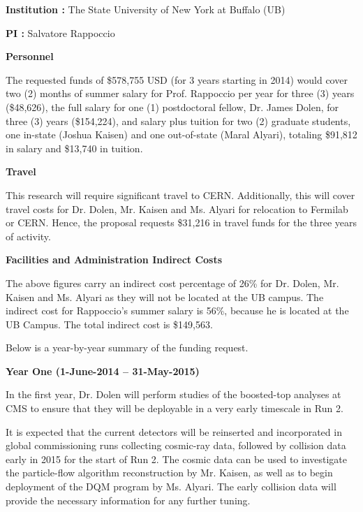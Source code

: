 \documentclass[12pt]{proposalnsf}
\begin{document}
{}


\newpage
{}
\renewcommand{\thepage} {B--\arabic{page}}

\bigskip
{\bf Institution : } The State University of New York at Buffalo (UB)

{\bf PI : } Salvatore Rappoccio


\bigskip
{\bf Personnel}
\bigskip


The requested funds of \$578,755 USD (for 3 years starting in 2014)
would cover two (2) months of summer salary for Prof. Rappoccio per
year for three (3) years
(\$48,626), the full salary for 
one (1) postdoctoral fellow, Dr. James Dolen, for three (3)
years (\$154,224), and salary plus
tuition for two (2) graduate students, one in-state (Joshua
Kaisen) and one out-of-state (Maral Alyari), totaling \$91,812 in
salary and \$13,740 in tuition. 


\bigskip
{\bf Travel}
\bigskip

This research will require significant travel to CERN. Additionally,
this will cover travel costs for Dr. Dolen, Mr. Kaisen and Ms. Alyari
for relocation to Fermilab or CERN. Hence, the proposal requests
\$31,216 in travel funds for the three years of activity. 

\bigskip
{\bf Facilities and Administration Indirect Costs}
\bigskip

The above figures carry an indirect cost
percentage of 26\% for Dr. Dolen, Mr. Kaisen and Ms. Alyari as they
will not be located at the UB campus. The indirect cost
for Rappoccio's summer salary is 56\%, because he is located at the
UB Campus. The total indirect cost is \$149,563.

Below is a year-by-year summary of the funding request. 

\bigskip
\bigskip
{\bf \Large Year One (1-June-2014 -- 31-May-2015)}
\bigskip

In the first year, Dr. Dolen will perform studies of the
boosted-top analyses at CMS to ensure that they will be
deployable in a very early timescale in Run 2. 

It is expected that the current
detectors will be reinserted and incorporated in global commissioning
runs collecting cosmic-ray data, followed by collision data early in 2015
for the start of Run 2. The cosmic data can be used to investigate the
particle-flow algorithm reconstruction by Mr. Kaisen, as well as to
begin deployment of the DQM program by Ms. Alyari. The early collision
data will provide the necessary information for any further
tuning. 
\end{document}

